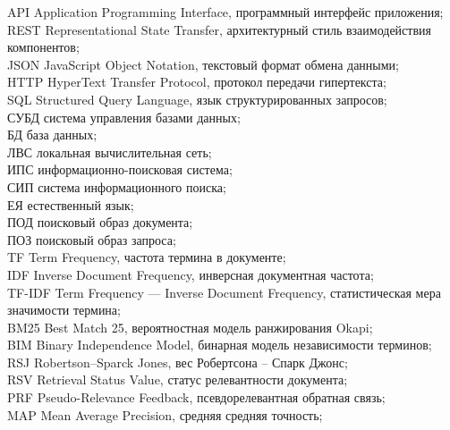 \label{sec:reduction}
\begin{flushleft}
	\setlength{\parindent}{1.25cm}
		\indent
	\indent API \mdash Application Programming Interface, программный интерфейс приложения;\\
	\indent REST \mdash Representational State Transfer, архитектурный стиль взаимодействия компонентов;\\
	\indent JSON \mdash JavaScript Object Notation, текстовый формат обмена данными;\\
	\indent HTTP \mdash HyperText Transfer Protocol, протокол передачи гипертекста;\\
	\indent SQL \mdash Structured Query Language, язык структурированных запросов;\\
	\indent СУБД \mdash система управления базами данных;\\
	\indent БД \mdash база данных;\\
	\indent ЛВС \mdash локальная вычислительная сеть;\\
	\indent ИПС \mdash информационно-поисковая система;\\
	\indent СИП \mdash система информационного поиска;\\
	\indent ЕЯ \mdash естественный язык;\\
	\indent ПОД \mdash поисковый образ документа;\\
	\indent ПОЗ \mdash поисковый образ запроса;\\
	\indent TF \mdash Term Frequency, частота термина в документе;\\
	\indent IDF \mdash Inverse Document Frequency, инверсная документная частота;\\
	\indent TF-IDF \mdash Term Frequency --- Inverse Document Frequency, статистическая мера значимости термина;\\
	\indent BM25 \mdash Best Match 25, вероятностная модель ранжирования Okapi;\\
	\indent BIM \mdash Binary Independence Model, бинарная модель независимости терминов;\\
	\indent RSJ \mdash Robertson--Sparck Jones, вес Робертсона -- Спарк Джонс;\\
	\indent RSV \mdash Retrieval Status Value, статус релевантности документа;\\
	\indent PRF \mdash Pseudo-Relevance Feedback, псевдорелевантная обратная связь;\\
	\indent MAP \mdash Mean Average Precision, средняя средняя точность;\\

\end{flushleft}
